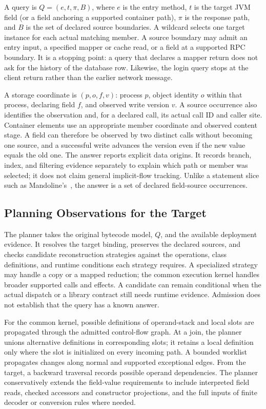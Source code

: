 A query is $Q=(e,t,\pi,B)$, where $e$ is the entry method, $t$ is the
target JVM field (or a field anchoring a supported container path), $\pi$
is the response path, and $B$ is the set of declared source boundaries.
A wildcard selects one target instance for each actual matching member.
A source boundary may admit an entry input, a specified mapper or cache
read, or a field at a supported RPC boundary. It is a stopping point:
a query that declares a mapper return does not ask for the history of the
database row. Likewise, the login query stops at the client return rather
than the earlier network message.

A storage coordinate is $(p,o,f,v)$: process $p$, object identity $o$
within that process, declaring field $f$, and observed write version $v$.
A source occurrence also identifies the observation and, for a declared
call, its actual call ID and caller site. Container elements use an
appropriate member coordinate and observed content stage. A field can
therefore be observed by two distinct calls without becoming one source,
and a successful write advances the version even if the new value equals
the old one. The answer reports explicit data origins. It records branch,
index, and filtering evidence separately to explain which path or member
was selected; it does not claim general implicit-flow tracking. Unlike a
statement slice such as Mandoline's~\cite{ahmed2021mandoline}, the answer is
a set of declared field-source occurrences.

\subsection{Planning Observations for the Target}
\label{sec:method-planning}

The planner takes the original bytecode model, $Q$, and the available
deployment evidence. It resolves the target binding, preserves the
declared sources, and checks candidate reconstruction strategies against
the operations, class definitions, and runtime conditions each strategy
requires. A specialized strategy may handle a copy or a mapped reduction;
the common execution kernel handles broader supported calls and effects.
A candidate can remain conditional when the actual dispatch or a library
contract still needs runtime evidence. Admission does not establish that
the query has a known answer.

For the common kernel, possible definitions of operand-stack and local
slots are propagated through the admitted control-flow graph. At a join,
the planner unions alternative definitions in corresponding slots; it
retains a local definition only where the slot is initialized on every
incoming path. A bounded worklist propagates changes along normal and
supported exceptional edges. From the target, a backward traversal records
possible operand dependencies. The planner conservatively extends the
field-value requirements to include interpreted field reads, checked
accessors and constructor projections, and the full inputs of finite
decoder or conversion rules where needed.


